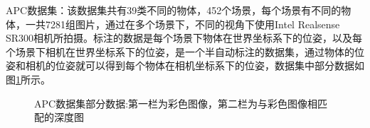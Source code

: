 {\kai APC数据集：}该数据集共有39类不同的物体，452个场景，每个场景有不同的物体，一共7281组图片，通过在多个场景下，不同的视角下使用Intel Realsense SR300相机所拍摄。标注的数据是每个场景下物体在世界坐标系下的位姿，以及每个场景下相机在世界坐标系下的位姿，是一个半自动标注的数据集，通过物体的位姿和相机的位姿就可以得到每个物体在相机坐标系下的位姿，数据集中部分数据如图\ref{fig:apc_dataset}所示。
\begin{figure}[ht]
  \centering
  \hskip0.2cm
  \hskip0.2cm
  \hskip0.2cm
  \vfill
  \hskip0.2cm
  \hskip0.2cm
  \hskip0.2cm
  \caption{APC数据集部分数据:第一栏为彩色图像，第二栏为与彩色图像相匹配的深度图}
  \label{fig:apc_dataset}
\end{figure}

